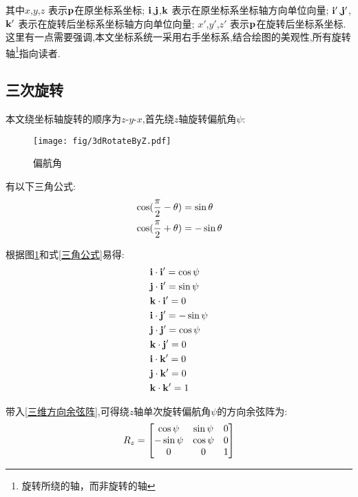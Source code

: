 其中$x$,$y$,$z$         表示$\mathbf{p}$在原坐标系坐标;
$\mathbf{i}$,$\mathbf{j}$,$\mathbf{k}$    表示在原坐标系坐标轴方向单位向量;
$\mathbf{i}'$,$\mathbf{j}'$,$\mathbf{k}'$ 表示在旋转后坐标系坐标轴方向单位向量;
$x'$,$y'$,$z'$          表示$\mathbf{p}$在旋转后坐标系坐标. 这里有一点需要强调,本文坐标系统一采用\textcolor[rgb]{1,0,0}{右手坐标系},结合绘图的美观性,所有旋转轴\footnote{旋转所绕的轴，而非旋转的轴}指向读者.

\subsection{三次旋转}
本文绕坐标轴旋转的顺序为$z$-$y$-$x$,首先绕$z$轴旋转偏航角$\psi$:
\begin{figure}[!hbp]
    \begin{center}
        \texttt{[image: fig/3dRotateByZ.pdf]}
        \caption{偏航角}\label{偏航角}
    \end{center}
\end{figure}

有以下三角公式:
\begin{equation}\label{三角公式}
    \begin{split}
        & \cos(\frac{\pi}{2}-\theta)=\sin\theta \\
        & \cos(\frac{\pi}{2}+\theta)=-\sin\theta
    \end{split}
\end{equation} 

根据图\ref{偏航角}和式\ref{三角公式}易得:
\begin{equation}\label{基向量运算}
    \begin{split}
        & \mathbf{i} \cdot \mathbf{i}'=\cos{\psi} \\
        & \mathbf{j} \cdot \mathbf{i}'=\sin{\psi} \\
        & \mathbf{k} \cdot \mathbf{i}'=0 \\
        & \mathbf{i} \cdot \mathbf{j}'=-\sin{\psi} \\
        & \mathbf{j} \cdot \mathbf{j}'=\cos{\psi} \\
        & \mathbf{k} \cdot \mathbf{j}'=0 \\
        & \mathbf{i} \cdot \mathbf{k}'=0 \\
        & \mathbf{j} \cdot \mathbf{k}'=0 \\
        & \mathbf{k} \cdot \mathbf{k}'=1
    \end{split}
\end{equation} 

带入\ref{三维方向余弦阵},可得绕$z$轴单次旋转偏航角$\psi$的方向余弦阵为:
\begin{equation}\label{偏航单次旋转方向余弦阵}
    \begin{split}
        R_z=
        \left[\begin{matrix}
                \cos{\psi} & \sin{\psi} & 0 \\
               -\sin{\psi} & \cos{\psi} & 0 \\
                0       &     0   & 1
        \end{matrix}\right]
    \end{split}
\end{equation}

